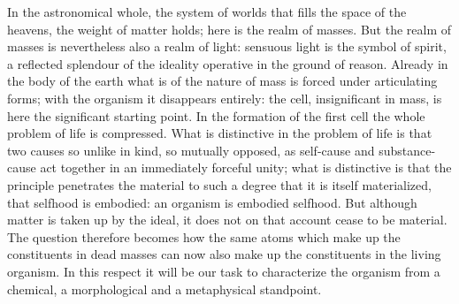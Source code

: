 \documentclass[12pt,a4paper]{book}
\begin{document}
In the astronomical whole, the system of worlds that fills the space of the
heavens, the weight of matter holds; here is
the realm of masses. But the realm of masses is nevertheless also a realm of
light: sensuous light is the symbol of spirit, a reflected splendour of the
ideality operative in the ground of reason. Already in the body of the earth
what is of the nature of mass is forced under articulating forms; with the
organism it disappears entirely: the cell, insignificant in mass, is here the
significant starting point. In the formation of the first cell the whole
problem of life is compressed. What is distinctive in the problem of life is
that two causes so unlike in kind, so mutually opposed, as self-cause and
substance-cause act together in an immediately forceful unity; what is
distinctive is that the principle penetrates the material to such a degree that
it is itself materialized, that selfhood is embodied: an organism is embodied
selfhood. But although matter is taken up by the ideal, it does not on that
account cease to be material. The question therefore becomes how the same atoms
which make up the constituents in dead masses can now also make up the
constituents in the living organism. In this respect it will be our task to
characterize the organism from a chemical, a morphological and a metaphysical
standpoint.
\end{document}
